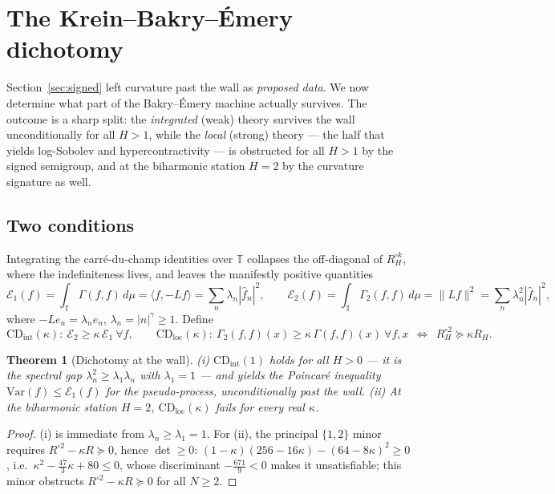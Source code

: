 \documentclass[11pt,reqno]{amsart}
\theoremstyle{plain}
\newtheorem{theorem}{Theorem}[section]
\theoremstyle{definition}
\newcommand{\T}{\mathbb{T}}
\newcommand{\Had}{\mathbin{\circ}}
\newcommand{\Gam}{\Gamma}
\begin{document}
\section{The Krein--Bakry--\'Emery dichotomy}\label{sec:dichotomy}

Section~\ref{sec:signed} left curvature past the wall as \emph{proposed data}.
We now determine what part of the Bakry--\'Emery machine actually survives. The
outcome is a sharp split: the \emph{integrated} (weak) theory survives the wall
unconditionally for all $H>1$, while the \emph{local} (strong) theory --- the half
that yields log-Sobolev and hypercontractivity --- is obstructed for all $H>1$ by
the signed semigroup, and at the biharmonic station $H=2$ by the curvature
signature as well.

\subsection{Two conditions}
Integrating the carr\'e-du-champ identities over $\T$ collapses the off-diagonal
of $R_H^{\Had k}$, where the indefiniteness lives, and leaves the manifestly
positive quantities
\[
  \mathcal E_1(f)=\int_\T\Gam(f,f)\,d\mu=\langle f,-Lf\rangle=\sum_n\lambda_n|\hat f_n|^2,
  \qquad
  \mathcal E_2(f)=\int_\T\Gam_2(f,f)\,d\mu=\|Lf\|^2=\sum_n\lambda_n^2|\hat f_n|^2,
\]
where $-Le_n=\lambda_n e_n$, $\lambda_n=|n|^{\gamma}\ge1$. Define
\[
  \mathrm{CD}_{\mathrm{int}}(\kappa):\ \mathcal E_2\ge\kappa\,\mathcal E_1\ \forall f,
  \qquad
  \mathrm{CD}_{\mathrm{loc}}(\kappa):\ \Gam_2(f,f)(x)\ge\kappa\,\Gam(f,f)(x)\ \forall f,x
  \ \ \Longleftrightarrow\ \ R_H^{\Had2}\succeq\kappa R_H .
\]

\begin{theorem}[Dichotomy at the wall]\label{thm:dichotomy}
\textup{(i)} $\mathrm{CD}_{\mathrm{int}}(1)$ holds for \emph{all} $H>0$ --- it is
the spectral gap $\lambda_n^2\ge\lambda_1\lambda_n$ with $\lambda_1=1$ --- and
yields the Poincar\'e inequality $\mathrm{Var}(f)\le\mathcal E_1(f)$ for the
pseudo-process, unconditionally past the wall.
\textup{(ii)} At the biharmonic station $H=2$, $\mathrm{CD}_{\mathrm{loc}}(\kappa)$
fails for every real $\kappa$.
\end{theorem}

\begin{proof}
(i) is immediate from $\lambda_n\ge\lambda_1=1$. For (ii), the principal
$\{1,2\}$ minor requires $R^{\Had2}-\kappa R\succeq0$, hence
$\det\ge0$: $(1-\kappa)(256-16\kappa)-(64-8\kappa)^2\ge0$, i.e.\
$\kappa^2-\tfrac{47}{3}\kappa+80\le0$, whose discriminant $-\tfrac{671}{9}<0$
makes it unsatisfiable; this minor obstructs $R^{\Had2}-\kappa R\succeq0$ for all
$N\ge2$.
\end{proof}
\end{document}
